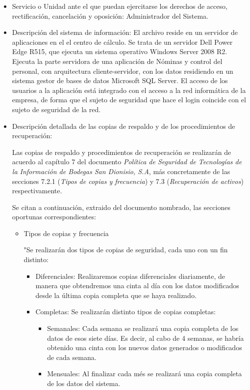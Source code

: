 \documentclass[a4paper,11pt,bibtotoc,noliststotoc]{scrbook}
\begin{document}
\begin{itemize}
\item Servicio o Unidad ante el que puedan ejercitarse los derechos de acceso, rectificación, cancelación y oposición: Administrador del Sistema.

\item Descripción del sistema de información: El archivo reside en un servidor de aplicaciones en el el centro de cálculo. Se trata de un servidor Dell Power Edge R515, que ejecuta un sistema operativo Windows Server 2008 R2. Ejecuta la parte servidora de una aplicación de Nóminas y control del personal, con arquitectura cliente-servidor, con los datos residiendo en un sistema gestor de bases de datos Microsoft SQL Server. El acceso de los usuarios a la aplicación está integrado con el acceso a la red informática de la empresa, de forma que el sujeto de seguridad que hace el login coincide con el sujeto de seguridad de la red.

\item Descripción detallada de las copias de respaldo y de los procedimientos de recuperación:

Las copias de respaldo y procedimientos de recuperación se realizarán de acuerdo al capítulo 7 del documento \emph{Política de Seguridad de Tecnologías de la Información de Bodegas San Dionisio, S.A}, más concretamente de las secciones 7.2.1 (\emph{Tipos de copias y frecuencia}) y 7.3 (\emph{Recuperación de activos}) respectivamente. 

Se citan a continuación, extraido del documento nombrado, las secciones oportunas correspondientes:

\begin{itemize}
\item Tipos de copias y frecuencia

"Se realizarán dos tipos de copias de seguridad, cada uno con un fin distinto: 

\begin{itemize}
\item Diferenciales: Realizaremos copias diferenciales diariamente, de manera que obtendremos una cinta al día con los datos modificados desde la última copia completa que se haya realizado. 

\item Completas: Se realizarán distinto tipos de copias completas:

	\begin{itemize}
	\item Semanales: Cada semana se realizará una copia completa de los datos de esos siete días. Es decir, al cabo de 4 semanas, se habría obtenido una cinta con los nuevos datos generados o modificados de cada semana.
	\item Mensuales: Al finalizar cada més se realizará una copia completa de los datos del sistema.
	\end{itemize}


\end{itemize}
\end{itemize}
\end{itemize}
\end{document}
